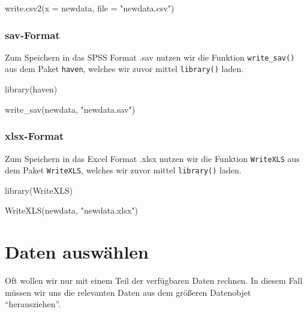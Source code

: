 \documentclass[
]{book}
\newenvironment{Shaded}{\begin{snugshade}}{\end{snugshade}}
\newcommand{\AttributeTok}[1]{\textcolor[rgb]{0.77,0.63,0.00}{#1}}
\newcommand{\FunctionTok}[1]{\textcolor[rgb]{0.00,0.00,0.00}{#1}}
\newcommand{\NormalTok}[1]{#1}
\newcommand{\StringTok}[1]{\textcolor[rgb]{0.31,0.60,0.02}{#1}}
\begin{document}
\begin{Shaded}
\begin{Highlighting}[]
\FunctionTok{write.csv2}\NormalTok{(}\AttributeTok{x =}\NormalTok{ newdata, }\AttributeTok{file =} \StringTok{"newdata.csv"}\NormalTok{)}
\end{Highlighting}
\end{Shaded}

\hypertarget{sav-format-1}{%
\subsection{sav-Format}\label{sav-format-1}}

Zum Speichern in das SPSS Format .sav nutzen wir die Funktion \texttt{write\_sav()} aus dem Paket \texttt{haven}, welches wir zuvor mittel \texttt{library()} laden.

\begin{Shaded}
\begin{Highlighting}[]
\FunctionTok{library}\NormalTok{(haven)}

\FunctionTok{write\_sav}\NormalTok{(newdata, }\StringTok{"newdata.sav"}\NormalTok{)}
\end{Highlighting}
\end{Shaded}

\hypertarget{xlsx-format-1}{%
\subsection{xlsx-Format}\label{xlsx-format-1}}

Zum Speichern in das Excel Format .xlsx nutzen wir die Funktion \texttt{WriteXLS} aus dem Paket \texttt{WriteXLS}, welches wir zuvor mittel \texttt{library()} laden.

\begin{Shaded}
\begin{Highlighting}[]
\FunctionTok{library}\NormalTok{(WriteXLS)}

\FunctionTok{WriteXLS}\NormalTok{(newdata, }\StringTok{"newdata.xlsx"}\NormalTok{)}
\end{Highlighting}
\end{Shaded}

\hypertarget{daten-auswuxe4hlen}{%
\chapter{Daten auswählen}\label{daten-auswuxe4hlen}}

Oft wollen wir nur mit einem Teil der verfügbaren Daten rechnen. In diesem Fall müssen wir uns die relevanten Daten aus dem größeren Datenobjet ``herausziehen''.
\end{document}

